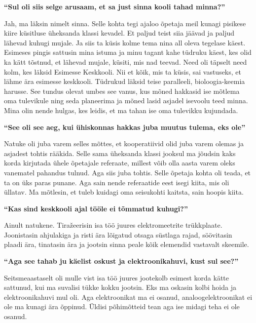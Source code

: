 \textbf{\enquote{Sul oli siis selge arusaam, et sa just sinna kooli tahad minna?}}

Jah, ma läksin nimelt sinna. Selle kohta tegi ajaloo õpetaja meil kunagi pisikese kiire küsitluse üheksanda klassi kevadel. Et paljud teist siia jäävad ja paljud lähevad kuhugi mujale. Ja siis ta küsis kolme tema nina all oleva tegelase käest. Esimeses pingis sattusin mina istuma ja minu tagant kahe tüdruku käest, kes olid ka kätt tõstnud, et lähevad mujale, küsiti, mis nad teevad. Need oli täpselt need kolm, kes läksid Esimesse Keskkooli. Nii et kõik, mis ta küsis, sai vastuseks, et lähme ära esimesse keskkooli. Tüdrukud läksid teise paralleeli, bioloogia-keemia harusse. See tundus olevat umbes see vanus, kus mõned hakkasid ise mõtlema oma tulevikule ning seda planeerima ja mõned lasid asjadel isevoolu teed minna. Mina olin nende hulgas, kes leidis, et ma tahan ise oma tulevikku kujundada.

\textbf{\enquote{See oli see aeg, kui ühiskonnas hakkas juba muutus tulema, eks ole}}

Natuke oli juba varem selles mõttes, et kooperatiivid olid juba varem olemas ja asjadest tohtis rääkida. Selle sama üheksanda klassi jooksul ma jõudsin kaks korda kirjutada ühele õpetajale referaate, millest võib olla aasta varem oleks vanematel pahandus tulnud. Aga siis juba tohtis. Selle õpetaja kohta oli teada, et ta on üks paras punane. Aga sain nende referaatide eest isegi kiita, mis oli üllatav. Ma mõtlesin, et tuleb kuidagi oma seisukohti kaitsta, sain hoopis kiita. 

\textbf{\enquote{Kas sind keskkooli ajal tööle ei tõmmatud kuhugi?}}

Ainult natukene. Tiražeerisin isa töö juures elektromeetrite trükkplaate. Joonistasin ahjulakiga ja risti ära lõigatud otsaga süstlaga rajad, söövitasin plaadi ära, tinatasin ära ja jootsin sinna peale kõik elemendid vastavalt skeemile. 

\textbf{\enquote{Aga see tahab ju käelist oskust ja elektroonikahuvi, kust sul see?}}

Seitsmeaastaselt oli mulle vist isa töö juures jootekolb esimest korda kätte sattunud, kui ma suvalisi tükke kokku jootsin. Eks ma oskasin kolbi hoida ja elektroonikahuvi mul oli. Aga elektroonikat ma ei osanud, analoogelektroonikat ei ole ma kunagi ära õppinud. Üldisi põhimõtteid tean aga ise midagi teha ei ole osanud.


